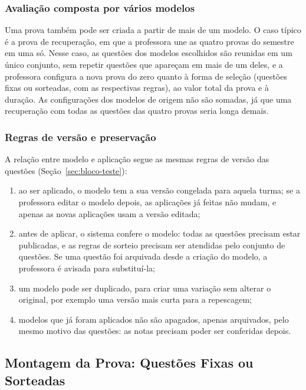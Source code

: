 \subsubsection*{Avaliação composta por vários modelos}

Uma prova também pode ser criada a partir de mais de um modelo. O caso típico é a prova de recuperação, em que a professora une as quatro provas do semestre em uma só. Nesse caso, as questões dos modelos escolhidos são reunidas em um único conjunto, sem repetir questões que apareçam em mais de um deles, e a professora configura a nova prova do zero quanto à forma de seleção (questões fixas ou sorteadas, com as respectivas regras), ao valor total da prova e à duração. As configurações dos modelos de origem não são somadas, já que uma recuperação com todas as questões das quatro provas seria longa demais.

\subsubsection*{Regras de versão e preservação}

A relação entre modelo e aplicação segue as mesmas regras de versão das questões (Seção~\ref{sec:bloco-teste}):

\begin{enumerate}
    \item ao ser aplicado, o modelo tem a sua versão congelada para aquela turma; se a professora editar o modelo depois, as aplicações já feitas não mudam, e apenas as novas aplicações usam a versão editada;
    \item antes de aplicar, o sistema confere o modelo: todas as questões precisam estar publicadas, e as regras de sorteio precisam ser atendidas pelo conjunto de questões. Se uma questão foi arquivada desde a criação do modelo, a professora é avisada para substituí-la;
    \item um modelo pode ser duplicado, para criar uma variação sem alterar o original, por exemplo uma versão mais curta para a repescagem;
    \item modelos que já foram aplicados não são apagados, apenas arquivados, pelo mesmo motivo das questões: as notas precisam poder ser conferidas depois.
\end{enumerate}

\subsection{Montagem da Prova: Questões Fixas ou Sorteadas}
\label{sec:montagem-prova}

